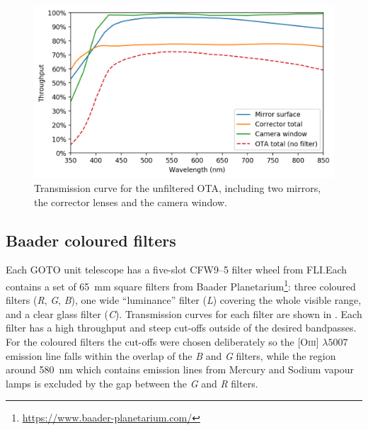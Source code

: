 \begin{colsection}
\begin{colsection}
\begin{figure}[t]
    \begin{center}
        \includegraphics[width=\textwidth]{images/throughput/trans_ota.png}
    \end{center}
    \caption[Combined OTA transmission curve]{
        Transmission curve for the unfiltered OTA, including two mirrors, the corrector lenses and the camera window.
    }\label{fig:trans_ota}
\end{figure}

\end{colsection}

\newpage
\subsection{Baader coloured filters}
\label{sec:filters}
\begin{colsection}

Each GOTO unit telescope has a five-slot CFW9--5 filter wheel from FLI.\@ Each contains a set of \SI{65}{\milli\metre} square filters from Baader Planetarium\footnote{\url{https://www.baader-planetarium.com/}}: three coloured filters (\textit{R}, \textit{G}, \textit{B}), one wide ``luminance'' filter (\textit{L}) covering the whole visible range, and a clear glass filter ({\textit{C}}). Transmission curves for each filter are shown in . Each filter has a high throughput and steep cut-offs outside of the desired bandpasses. For the coloured filters the cut-offs were chosen deliberately so the [O\textsc{iii}] $\lambda 5007$ emission line falls within the overlap of the \textit{B} and \textit{G} filters, while the region around \SI{580}{\nano\metre} which contains emission lines from Mercury and Sodium vapour lamps is excluded by the gap between the \textit{G} and \textit{R} filters.


\end{colsection}
\end{colsection}
